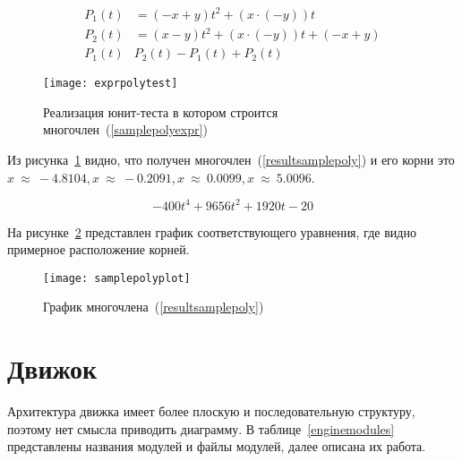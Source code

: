 \begin{align}\label{samplepolyexpr}
    P_1(t) & = (-x + y)t^2 + (x \cdot (-y))t \nonumber           \\
    P_2(t) & = (x - y)t^2 + (x \cdot (-y))t + (-x + y) \nonumber \\
    P_1(t) & P_2(t) - P_1(t) + P_2(t)
\end{align}

\begin{figure}[H]
    \centering
    \texttt{[image: exprpolytest]}
    \caption{Реализация юнит-теста в котором строится многочлен~(\ref{samplepolyexpr})\label{exprpolytestcode}}
\end{figure}

Из рисунка~\ref{exprpolytestcode} видно, что получен многочлен~(\ref{resultsamplepoly}) и его корни это \(x~\approx~-4.8104, x~\approx~-0.2091, x~\approx~0.0099, x~\approx~5.0096\).

\begin{equation}\label{resultsamplepoly}
    -400t^4 + 9656t^2 + 1920t - 20
\end{equation}

На рисунке~\ref{samplepolyplotfig} представлен график соответствующего уравнения, где видно примерное расположение корней.

\begin{figure}[H]
    \centering
    \texttt{[image: samplepolyplot]}
    \caption{График многочлена~(\ref{resultsamplepoly})\label{samplepolyplotfig}}
\end{figure}

\section{Движок}\label{engine}

Архитектура движка имеет более плоскую и последовательную структуру, поэтому нет смысла приводить диаграмму.
В таблице~\ref{enginemodules} представлены названия модулей и файлы модулей, далее описана их работа.

